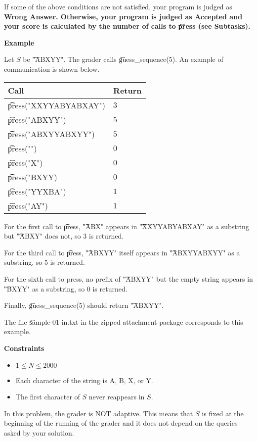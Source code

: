 If some of the above conditions are not satisfied, your program is judged as \bf{Wrong Answer}. Otherwise, your program is judged as \bf{Accepted} and your score is calculated by the number of calls to \t{press} (see Subtasks).

\bf{Example}

Let $S$ be \t{"ABXYY"}. The grader calls \t{guess_sequence(5)}. An example of communication is shown below.

\begin{tabular}{|l|l|}\hline
\bf{Call}&\bf{Return}\\\hline
\t{press("XXYYABYABXAY")}&$3$\\\hline
\t{press("ABXYY")}&$5$\\\hline
\t{press("ABXYYABXYY")}&$5$\\\hline
\t{press("")}&$0$\\\hline
\t{press("X")}&$0$\\\hline
\t{press("BXYY)}&$0$\\\hline
\t{press("YYXBA")}&$1$\\\hline
\t{press("AY")}&$1$\\\hline
\end{tabular}



For the first call to \t{press}, \t{"ABX"} appears in \t{"XXYYABYABXAY"} as a substring but \t{"ABXY"} does not, so $3$ is returned.

For the third call to \t{press}, \t{"ABXYY"} itself appears in \t{"ABXYYABXYY"} as a substring, so $5$ is returned.

For the sixth call to press, no prefix of \t{"ABXYY"} but the empty string appears in \t{"BXYY"} as a substring, so $0$ is returned.

Finally, \t{guess_sequence(5)} should return \t{"ABXYY"}.

The file \t{sample-01-in.txt} in the zipped attachment package corresponds to this example.

\bf{Constraints}

\begin{itemize}
\item $1 \le N \le 2000$
\item Each character of the string is A, B, X, or Y.
\item The first character of $S$ never reappears in $S$.
\end{itemize}

In this problem, the grader is NOT adaptive. This means that $S$ is fixed at the beginning of the running of the grader and it does not depend on the queries asked by your solution. 

